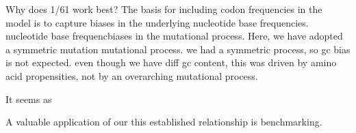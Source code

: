 \documentclass[11pt]{article}
\begin{document}
Why does 1/61 work best? The basis for including codon frequencies in the model is to capture biases in the underlying nucleotide base frequencies.
nucleotide base frequencbiases in the mutational process. Here, we have adopted a symmetric mutation
mutational process. we had a symmetric process, so gc bias is not expected. even though we have diff gc content, this was driven by amino acid propensities, not by an overarching mutational process. 


It seems as 


A valuable application of our this established relationship is benchmarking.


\end{document}
